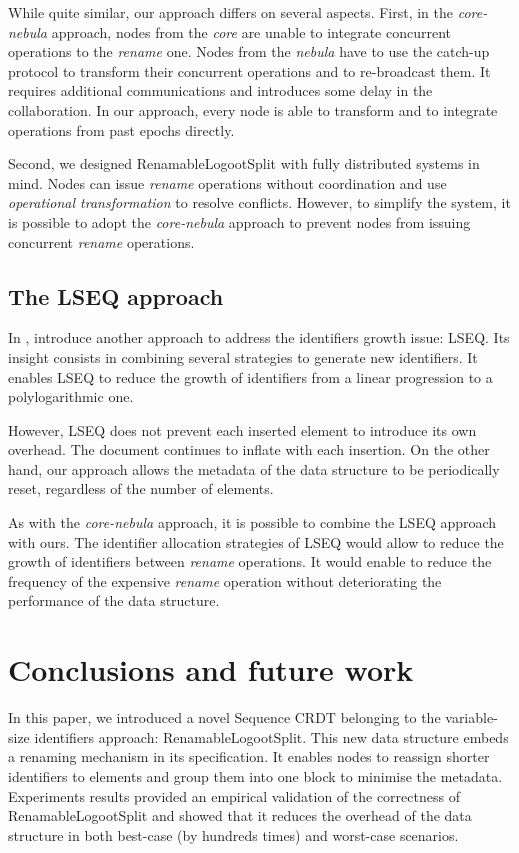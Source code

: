 \documentclass[sigplan,10pt,authorversion]{acmart}
\begin{document}
While quite similar, our approach differs on several aspects.
First, in the \emph{core-nebula} approach, nodes from the \emph{core} are unable to integrate concurrent operations to the \emph{rename} one.
Nodes from the \emph{nebula} have to use the catch-up protocol to transform their concurrent operations and to re-broadcast them.
It requires additional communications and introduces some delay in the collaboration.
In our approach, every node is able to transform and to integrate operations from past epochs directly.

Second, we designed RenamableLogootSplit with fully distributed systems in mind.
Nodes can issue \emph{rename} operations without coordination and use \emph{operational transformation} to resolve conflicts.
However, to simplify the system, it is possible to adopt the \emph{core-nebula} approach to prevent nodes from issuing concurrent \emph{rename} operations.

\subsection{The LSEQ approach}

In \cite{nedelec_2013_lseq,doi:10.1002/cpe.4108}, \citeauthor{nedelec_2013_lseq} introduce another approach to address the identifiers growth issue: LSEQ.
Its insight consists in combining several strategies to generate new identifiers.
It enables LSEQ to reduce the growth of identifiers from a linear progression to a polylogarithmic one.

However, LSEQ does not prevent each inserted element to introduce its own overhead.
The document continues to inflate with each insertion.
On the other hand, our approach allows the metadata of the data structure to be periodically reset, regardless of the number of elements.

As with the \emph{core-nebula} approach, it is possible to combine the LSEQ approach with ours.
The identifier allocation strategies of LSEQ would allow to reduce the growth of identifiers between \emph{rename} operations.
It would enable to reduce the frequency of the expensive \emph{rename} operation without deteriorating the performance of the data structure.

\section{Conclusions and future work}
\label{sec:conclusion}

\begin{sloppypar}
In this paper, we introduced a novel Sequence \ac{CRDT} belonging to the variable-size identifiers approach: RenamableLogootSplit.
This new data structure embeds a renaming mechanism in its specification.
It enables nodes to reassign shorter identifiers to elements and group them into one block to minimise the metadata.
Experiments results provided an empirical validation of the correctness of RenamableLogootSplit and showed that it reduces the overhead of the data structure in both best-case (by hundreds times) and worst-case scenarios.
\end{sloppypar}
\end{document}
